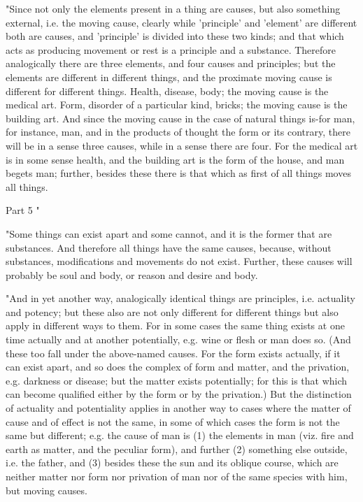 "Since not only the elements present in a thing are causes, but also
something external, i.e. the moving cause, clearly while 'principle'
and 'element' are different both are causes, and 'principle' is divided
into these two kinds; and that which acts as producing movement or
rest is a principle and a substance. Therefore analogically there
are three elements, and four causes and principles; but the elements
are different in different things, and the proximate moving cause
is different for different things. Health, disease, body; the moving
cause is the medical art. Form, disorder of a particular kind, bricks;
the moving cause is the building art. And since the moving cause in
the case of natural things is-for man, for instance, man, and in the
products of thought the form or its contrary, there will be in a sense
three causes, while in a sense there are four. For the medical art
is in some sense health, and the building art is the form of the house,
and man begets man; further, besides these there is that which as
first of all things moves all things. 

Part 5 "

"Some things can exist apart and some cannot, and it is the former
that are substances. And therefore all things have the same causes,
because, without substances, modifications and movements do not exist.
Further, these causes will probably be soul and body, or reason and
desire and body. 

"And in yet another way, analogically identical things are principles,
i.e. actuality and potency; but these also are not only different
for different things but also apply in different ways to them. For
in some cases the same thing exists at one time actually and at another
potentially, e.g. wine or flesh or man does so. (And these too fall
under the above-named causes. For the form exists actually, if it
can exist apart, and so does the complex of form and matter, and the
privation, e.g. darkness or disease; but the matter exists potentially;
for this is that which can become qualified either by the form or
by the privation.) But the distinction of actuality and potentiality
applies in another way to cases where the matter of cause and of effect
is not the same, in some of which cases the form is not the same but
different; e.g. the cause of man is (1) the elements in man (viz.
fire and earth as matter, and the peculiar form), and further (2)
something else outside, i.e. the father, and (3) besides these the
sun and its oblique course, which are neither matter nor form nor
privation of man nor of the same species with him, but moving causes.

